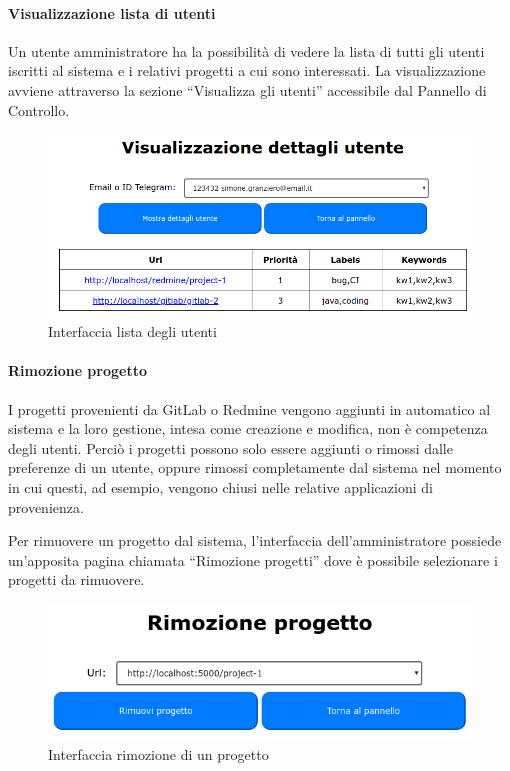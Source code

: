\paragraph{Visualizzazione lista di utenti}
Un utente amministratore ha la possibilità di vedere la lista di tutti gli utenti iscritti al sistema e i relativi progetti a cui sono interessati.
La visualizzazione avviene attraverso la sezione ``Visualizza gli utenti'' accessibile dal Pannello di Controllo.
\begin{figure}[H]
	\centering
	\includegraphics[width=12cm]{img/user_details.png}
	\caption{Interfaccia lista degli utenti}
\end{figure}

\paragraph{Rimozione progetto}
I progetti provenienti da GitLab o Redmine vengono aggiunti in automatico al sistema e la loro gestione, intesa come creazione e modifica, non è competenza degli utenti. Perciò i progetti possono solo essere aggiunti o rimossi dalle preferenze di un utente, oppure rimossi completamente dal sistema nel momento in cui questi, ad esempio, vengono chiusi nelle relative applicazioni di provenienza. \par
Per rimuovere un progetto dal sistema, l'interfaccia dell'amministratore possiede un'apposita pagina chiamata ``Rimozione progetti'' dove è possibile selezionare i progetti da rimuovere.
\begin{figure}[H]
	\centering
	\includegraphics[width=12cm]{img/rimozione_2.png}
	\caption{Interfaccia rimozione di un progetto}
\end{figure}

